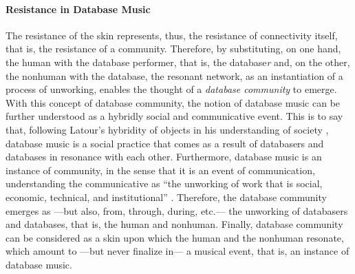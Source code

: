 \paragraph{Resistance in Database Music}
The resistance of the skin represents, thus, the resistance of connectivity itself, that is, the resistance of a community. Therefore, by substituting, on one hand, the human with the database performer, that is, the database\textit{r} and, on the other, the nonhuman with the database, the resonant network, as an instantiation of a process of unworking, enables the thought of a \textit{database community} to emerge. With this concept of database community, the notion of database music can be further understood as a hybridly social and communicative event. This is to say that, following Latour's hybridity of objects in his understanding of society \parencite[2]{Lat90:On}, database music is a social practice that comes as a result of databasers and databases in resonance with each other. Furthermore, database music is an instance of community, in the sense that it is an event of communication, understanding the communicative as ``the unworking of work that is social, economic, technical, and institutional'' \parencite[31]{Nan91:The}. Therefore, the database community emerges as ---but also, from, through, during, etc.--- the unworking of databasers and databases, that is, the human and nonhuman. Finally, database community can be considered as a skin upon which the human and the nonhuman resonate, which amount to ---but never finalize in--- a musical event, that is, an instance of database music.
